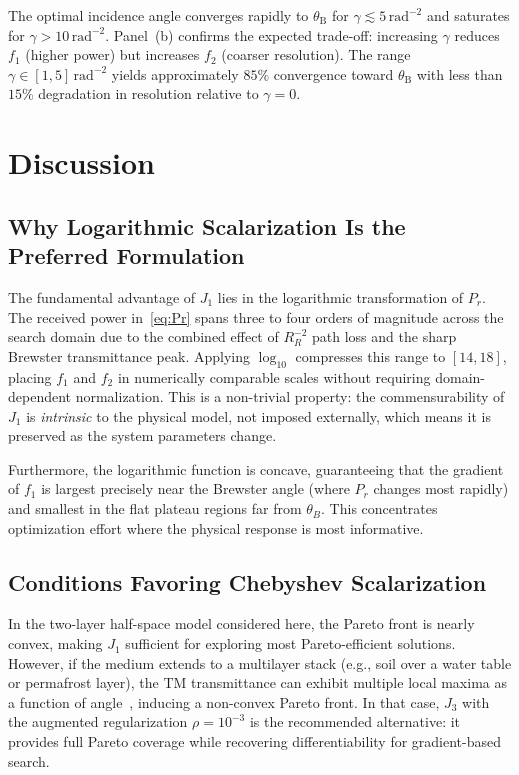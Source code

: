 \documentclass[journal]{IEEEtran}
\newcommand{\thetaB}{\theta_{\mathrm{B}}}
\begin{document}
The optimal incidence angle converges rapidly to $\thetaB$ for
$\gamma \lesssim 5\,\mathrm{rad}^{-2}$ and saturates for
$\gamma > 10\,\mathrm{rad}^{-2}$. Panel~(b) confirms the expected trade-off:
increasing $\gamma$ reduces $f_1$ (higher power) but increases $f_2$ (coarser
resolution). The range $\gamma \in [1, 5]\,\mathrm{rad}^{-2}$ yields
approximately $85\%$ convergence toward $\thetaB$ with less than $15\%$
degradation in resolution relative to $\gamma = 0$.

\section{Discussion}
\label{sec:discussion}

\subsection{Why Logarithmic Scalarization Is the Preferred Formulation}

The fundamental advantage of $J_1$ lies in the logarithmic transformation of
$P_r$. The received power in~\eqref{eq:Pr} spans three to four orders of
magnitude across the search domain due to the combined effect of $R_R^{-2}$
path loss and the sharp Brewster transmittance peak. Applying $\log_{10}$
compresses this range to $[14, 18]$, placing $f_1$ and $f_2$ in numerically
comparable scales without requiring domain-dependent normalization. This is a
non-trivial property: the commensurability of $J_1$ is \emph{intrinsic} to the
physical model, not imposed externally, which means it is preserved as the
system parameters change.

Furthermore, the logarithmic function is concave, guaranteeing that the
gradient of $f_1$ is largest precisely near the Brewster angle (where $P_r$
changes most rapidly) and smallest in the flat plateau regions far from
$\theta_B$. This concentrates optimization effort where the physical response
is most informative.

\subsection{Conditions Favoring Chebyshev Scalarization}

In the two-layer half-space model considered here, the Pareto front is nearly
convex, making $J_1$ sufficient for exploring most Pareto-efficient solutions.
However, if the medium extends to a multilayer stack (e.g., soil over a water
table or permafrost layer), the TM transmittance can exhibit multiple local
maxima as a function of angle~\cite{balanis2012}, inducing a non-convex Pareto
front. In that case, $J_3$ with the augmented regularization
$\rho = 10^{-3}$ is the recommended alternative: it provides full Pareto
coverage while recovering differentiability for gradient-based search.
\end{document}

